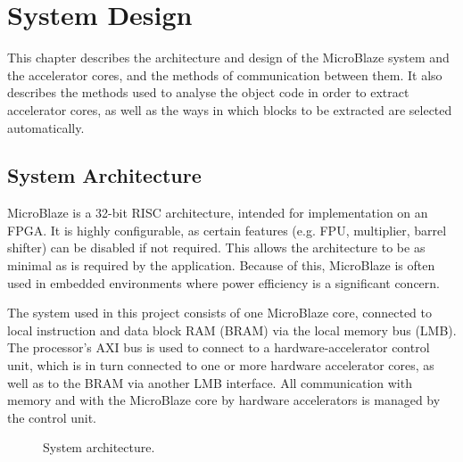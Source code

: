 \documentclass{UoYCSproject}
\begin{document}
\chapter{System Design}

This chapter describes the architecture and design of the MicroBlaze system and the accelerator cores, and the
methods of communication between them. It also describes the methods used to analyse the object code in order to
extract accelerator cores, as well as the ways in which blocks to be extracted are selected automatically.

\section{System Architecture}

MicroBlaze \cite{microblaze} is a 32-bit RISC architecture, intended for implementation on an FPGA.
It is highly configurable, as certain features (e.g. FPU, multiplier, barrel shifter) can be disabled if not required.
This allows the architecture to be as minimal as is required by the application. Because of this, MicroBlaze is often used in
embedded environments where power efficiency is a significant concern.

The system used in this project consists of one MicroBlaze core, connected to local instruction and data block RAM (BRAM)
via the local memory bus (LMB). The processor's AXI bus is used to connect to a hardware-accelerator control unit, which is
in turn connected to one or more hardware accelerator cores, as well as to the BRAM via another LMB interface.
All communication with memory and with the MicroBlaze core by hardware accelerators is managed by the control unit.

\begin{figure}[H]
\caption{System architecture.}
\label{fig:systemArchitecture}
\end{figure}
\end{document}
